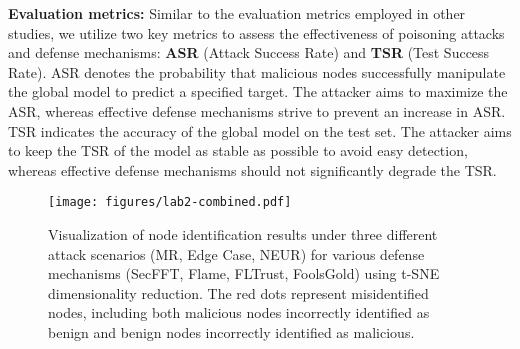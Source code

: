 \documentclass[lettersize,journal]{IEEEtran}
\begin{document}
\textbf{Evaluation metrics:}
Similar to the evaluation metrics employed in other studies\cite{tang2023port, jin2024learning, rong2023special}, we utilize two key metrics to assess the effectiveness of poisoning attacks and defense mechanisms: \textbf{ASR} (Attack Success Rate) and \textbf{TSR} (Test Success Rate). ASR denotes the probability that malicious nodes successfully manipulate the global model to predict a specified target. The attacker aims to maximize the ASR, whereas effective defense mechanisms strive to prevent an increase in ASR. TSR indicates the accuracy of the global model on the test set. The attacker aims to keep the TSR of the model as stable as possible to avoid easy detection, whereas effective defense mechanisms should not significantly degrade the TSR.

\begin{figure*}[!t]
    \centering
    \texttt{[image: figures/lab2-combined.pdf]}
    \caption{Visualization of node identification results under three different attack scenarios (MR, Edge Case, NEUR) for various defense mechanisms (SecFFT, Flame, FLTrust, FoolsGold) using t-SNE dimensionality reduction. The red dots represent misidentified nodes, including both malicious nodes incorrectly identified as benign and benign nodes incorrectly identified as malicious. }
    \label{fig:lab2}
\end{figure*}
\end{document}
